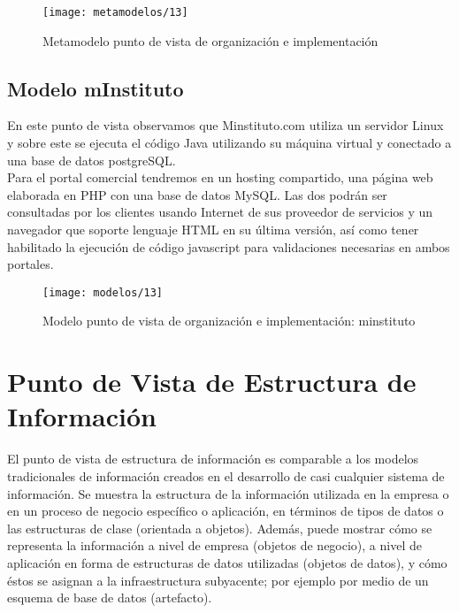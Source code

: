   \begin{figure}[H]
  	\centering
  	\texttt{[image: metamodelos/13]}
  	\captionsetup{width=.95\textwidth}
  	\caption{Metamodelo punto de vista de organización e implementación \cite{ref9}}
  	\label{metamodelo13}
  \end{figure}
  
  \subsection{Modelo mInstituto}
  En este punto de vista observamos que Minstituto.com utiliza un servidor Linux y sobre este se ejecuta el código Java utilizando su máquina virtual y conectado a una base de datos postgreSQL. \\
  
  Para el portal comercial tendremos en un hosting compartido, una página web elaborada en PHP con una base de datos MySQL. Las dos podrán ser consultadas por los clientes usando Internet de sus proveedor de servicios y un navegador que soporte lenguaje HTML en su última versión, así como tener habilitado la ejecución de código javascript para validaciones necesarias en ambos portales.

  \begin{figure}[H]
  	\centering
  	\texttt{[image: modelos/13]}
  	\captionsetup{width=.95\textwidth}
  	\caption{Modelo punto de vista de organización e implementación: minstituto}
  	\label{modelo13}
  \end{figure}

\section{Punto de Vista de Estructura de Información}
El punto de vista de estructura de información es comparable a los modelos tradicionales de información creados en el desarrollo de casi cualquier sistema de información. Se muestra la estructura de la información utilizada en la empresa o en un proceso de negocio específico o aplicación, en términos de tipos de datos o las estructuras de clase (orientada a objetos). Además, puede mostrar cómo se representa la información a nivel de empresa (objetos de negocio), a nivel de aplicación en forma de estructuras de datos utilizadas (objetos de datos), y cómo éstos se asignan a la infraestructura subyacente; por ejemplo por medio de un esquema de base de datos (artefacto). \cite{ref9}
    
